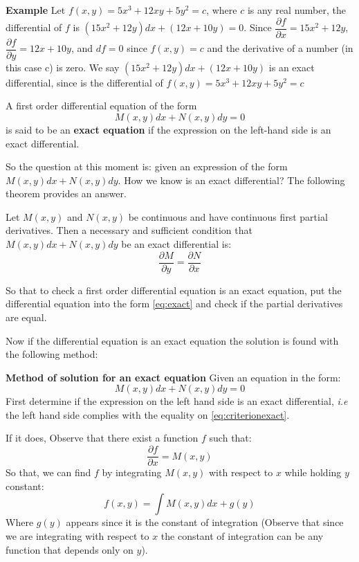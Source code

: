 \textbf{Example}
Let $ f(x,y) = 5x^3 + 12xy + 5y^2 = c $, where $c$ is any real number, the differential of $f$ is $ (15x^2 + 12y) dx + ( 12x + 10y) = 0 $. Since $ \dfrac{\partial f}{\partial x} = 15x^2 + 12y $, $\dfrac{\partial f}{\partial y} = 12x + 10y$, and $ df = 0 $ since $ f(x,y) = c$ and the derivative of a number (in this case c) is zero. We say $ (15x^2 + 12y) dx + ( 12x + 10y)  $ is an exact differential, since is the differential of $ f(x,y) = 5x^3 + 12xy + 5y^2 = c$
\begin{define}
A first order differential equation of the form
\begin{equation} \label{eq:exact}
M(x,y)dx + N(x,y)dy = 0
\end{equation}
is said to be an \textbf{exact equation} if the expression on the left-hand side is an exact differential.
\end{define}
So the question at this moment is: given an expression of the form $M(x,y)dx + N(x,y)dy$. How we know is an exact differential? The following theorem provides an answer.
\begin{thm}
Let $M(x,y)$ and $N(x,y)$ be continuous and have continuous first partial derivatives. Then a necessary and sufficient condition that $M(x,y)dx + N(x,y)dy$ be an exact differential is:
\begin{equation} \label{eq:criterionexact}
\dfrac{\partial M}{\partial y} = \dfrac{\partial N}{\partial x}
\end{equation} 
\end{thm}
So that to check a first order differential equation is an exact equation, put the differential equation into the form \eqref{eq:exact} and check if the partial derivatives are equal.

Now if the differential equation is an exact equation the solution is found with the following method:

\textbf{Method of solution for an exact equation}
Given an equation in the form:
\begin{equation*}
M(x,y)dx + N(x,y)dy = 0
\end{equation*}
First determine if the expression on the left hand side is an exact differential, \textit{i.e} the left hand side complies with the equality on \eqref{eq:criterionexact}. 

If it does, Observe that there exist a function $f$ such that:
\begin{equation*}
\dfrac{\partial f}{\partial x} = M(x,y)
\end{equation*}
So that, we can find $f$ by integrating $M(x,y)$ with respect to $x$ while holding $y$ constant:
\begin{equation*}
f(x,y) = \int M(x,y) dx + g(y)
\end{equation*}
Where $g(y)$ appears since it is the constant of integration (Observe that since we are integrating with respect to $x$ the constant of integration can be any function that depends only on $y$).

